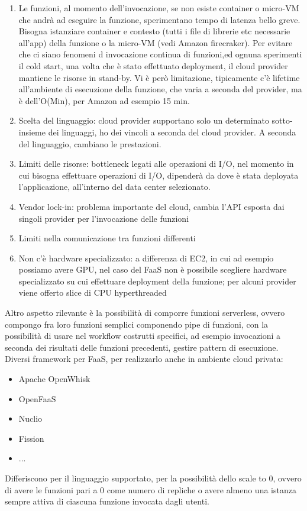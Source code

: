 \documentclass[16px]{article}
\begin{document}
\begin{enumerate}
\item Le funzioni, al momento dell'invocazione, se non esiste container o micro-VM che andrà ad eseguire la funzione, sperimentano tempo di latenza bello greve. Bisogna istanziare container e contesto (tutti i file di librerie etc necessarie all'app) della funzione o la micro-VM (vedi Amazon firecraker). Per evitare che ci siano fenomeni d invocazione continua di funzioni,ed ognuna sperimenti il cold start, una volta che è stato effettuato deployment, il cloud provider mantiene le risorse in stand-by. Vi è però limitazione, tipicamente c'è lifetime all'ambiente di esecuzione della funzione, che varia a seconda del provider, ma è dell'O(Min), per Amazon ad esempio 15 min.
\item Scelta del linguaggio: cloud provider supportano solo un determinato sotto-insieme dei linguaggi, ho dei vincoli a seconda del cloud provider. A seconda del linguaggio, cambiano le prestazioni.
\item Limiti delle risorse: bottleneck legati alle operazioni di I/O, nel momento in cui bisogna effettuare operazioni di I/O, dipenderà da dove è stata deployata l'applicazione, all'interno del data center selezionato.
\item Vendor lock-in: problema importante del cloud, cambia l'API esposta dai singoli provider per l'invocazione delle funzioni
\item Limiti nella comunicazione tra funzioni differenti
\item Non c'è hardware specializzato: a differenza di EC2, in cui ad esempio possiamo avere GPU, nel caso del FaaS non è possibile scegliere hardware specializzato su cui effettuare deployment della funzione; per alcuni provider viene offerto slice di CPU hyperthreaded
\end{enumerate}
Altro aspetto rilevante è la possibilità di comporre funzioni serverless, ovvero compongo fra loro funzioni semplici componendo pipe di funzioni, con la possibilità di usare nel workflow costrutti specifici, ad esempio invocazioni a seconda dei risultati delle funzioni precedenti, gestire pattern di esecuzione. Diversi framework per FaaS, per realizzarlo anche in ambiente cloud privata:
\begin{itemize}
\item Apache OpenWhisk
\item OpenFaaS
\item Nuclio
\item Fission
\item ...
\end{itemize}
Differiscono per il linguaggio supportato, per la possibilità dello scale to 0, ovvero di avere le funzioni pari a 0 come numero di repliche o avere almeno una istanza sempre attiva di ciascuna funzione invocata dagli utenti.
\end{document}
